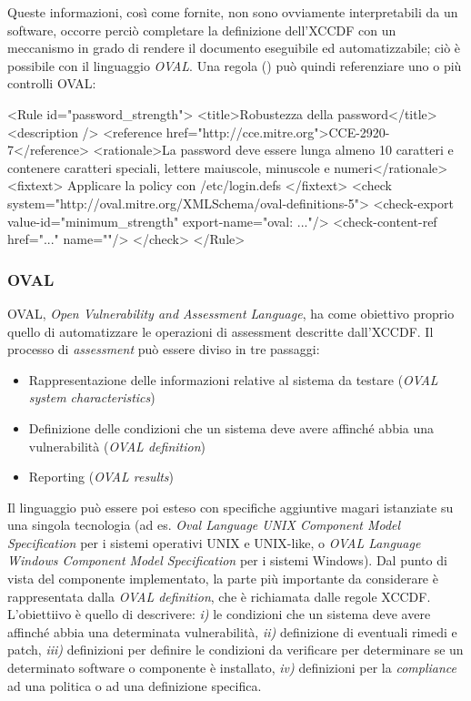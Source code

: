 \documentclass[../main.tex]{subfiles}
\begin{document}
Queste informazioni, così come fornite, non sono ovviamente interpretabili da un software, occorre perciò completare la definizione dell'XCCDF con un meccanismo in grado di rendere il documento eseguibile ed automatizzabile; ciò è possibile con il linguaggio \textit{OVAL}.
Una regola () può quindi referenziare uno o più controlli OVAL:
\begin{xml}
<Rule id="password_strength">
    <title>Robustezza della password</title>
    <description />
    <reference href="http://cce.mitre.org">CCE-2920-7</reference>
    <rationale>La password deve essere lunga almeno 10 caratteri e contenere caratteri speciali, lettere maiuscole, minuscole e numeri</rationale>
    <fixtext>
        Applicare la policy con /etc/login.defs 
    </fixtext>
    <check system="http://oval.mitre.org/XMLSchema/oval-definitions-5">
        <check-export value-id="minimum_strength" export-name="oval: ..."/>
        <check-content-ref href="..." name=""/>
    </check>
</Rule>
\end{xml}

\subsubsection{OVAL}
OVAL, \textit{Open Vulnerability and Assessment Language}, ha come obiettivo proprio quello di automatizzare le operazioni di assessment descritte dall'XCCDF.
Il processo di \textit{assessment} può essere diviso in tre passaggi:
\begin{itemize}
    \item Rappresentazione delle informazioni relative al sistema da testare (\textit{OVAL system characteristics})
    \item Definizione delle condizioni che un sistema deve avere affinché abbia una vulnerabilità (\textit{OVAL definition})
    \item Reporting (\textit{OVAL results})
\end{itemize}
Il linguaggio può essere poi esteso con specifiche aggiuntive magari istanziate su una singola tecnologia (ad es. \textit{Oval Language UNIX Component Model Specification} per i sistemi operativi UNIX e UNIX-like, o \textit{OVAL Language Windows Component Model Specification} per i sistemi Windows).
Dal punto di vista del componente implementato, la parte più importante da considerare è rappresentata dalla \textit{OVAL definition}, che è richiamata dalle regole XCCDF.
L'obiettiivo è quello di descrivere: \textit{i)} le condizioni che un sistema deve avere affinché abbia una determinata vulnerabilità, \textit{ii)} definizione di eventuali rimedi e patch, \textit{iii)} definizioni per definire le condizioni da verificare per determinare se un determinato software o componente è installato, \textit{iv)} definizioni per la \textit{compliance} ad una politica o ad una definizione specifica.
\end{document}
